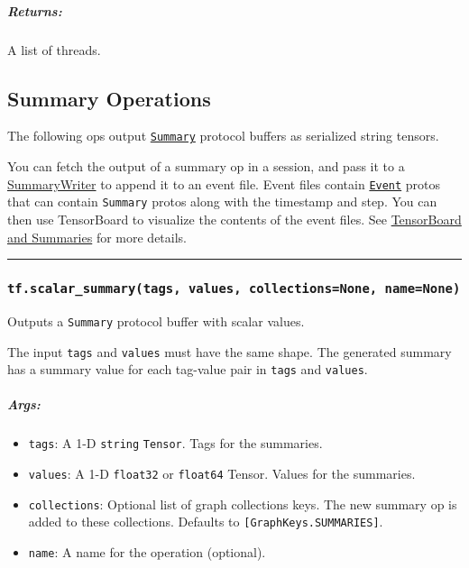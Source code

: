 \subparagraph{Returns: }\label{returns-20}

A list of threads.

\subsection{Summary Operations }\label{summary-operations}

The following ops output
\href{https://tensorflow.googlesource.com/tensorflow/+/master/tensorflow/core/framework/summary.proto}{\texttt{Summary}}
protocol buffers as serialized string tensors.

You can fetch the output of a summary op in a session, and pass it to a
\href{../../api_docs/python/train.md\#SummaryWriter}{SummaryWriter} to
append it to an event file. Event files contain
\href{https://tensorflow.googlesource.com/tensorflow/+/master/tensorflow/core/util/event.proto}{\texttt{Event}}
protos that can contain \texttt{Summary} protos along with the timestamp
and step. You can then use TensorBoard to visualize the contents of the
event files. See
\href{../../how_tos/summaries_and_tensorboard/index.md}{TensorBoard and
Summaries} for more details.

\begin{center}\rule{0.5\linewidth}{\linethickness}\end{center}

\subsubsection{\texorpdfstring{\texttt{tf.scalar\_summary(tags,\ values,\ collections=None,\ name=None)}
}{tf.scalar\_summary(tags, values, collections=None, name=None) }}\label{tf.scalarux5fsummarytags-values-collectionsnone-namenone}

Outputs a \texttt{Summary} protocol buffer with scalar values.

The input \texttt{tags} and \texttt{values} must have the same shape.
The generated summary has a summary value for each tag-value pair in
\texttt{tags} and \texttt{values}.

\subparagraph{Args: }\label{args-30}

\begin{itemize}
\tightlist
\item
  \texttt{tags}: A 1-D \texttt{string} \texttt{Tensor}. Tags for the
  summaries.
\item
  \texttt{values}: A 1-D \texttt{float32} or \texttt{float64} Tensor.
  Values for the summaries.
\item
  \texttt{collections}: Optional list of graph collections keys. The new
  summary op is added to these collections. Defaults to
  \texttt{{[}GraphKeys.SUMMARIES{]}}.
\item
  \texttt{name}: A name for the operation (optional).
\end{itemize}

